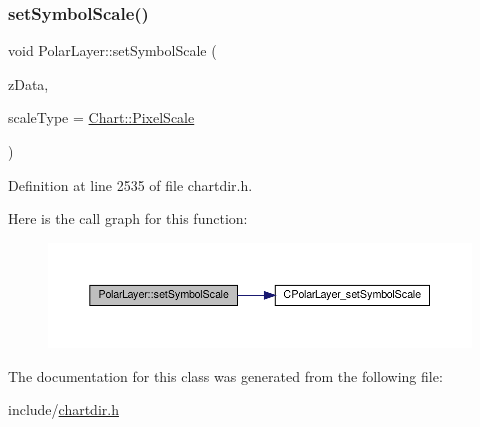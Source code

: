 \subsubsection{\texorpdfstring{set\+Symbol\+Scale()}{setSymbolScale()}}
{\footnotesize\ttfamily void Polar\+Layer\+::set\+Symbol\+Scale (\begin{DoxyParamCaption}\item[{\hyperlink{class_double_array}{Double\+Array}}]{z\+Data,  }\item[{int}]{scale\+Type = {\ttfamily \hyperlink{namespace_chart_af8005281e1fb57d737e9f89b13605808afebebf69a28e58958dc5f9da3ece2147}{Chart\+::\+Pixel\+Scale}} }\end{DoxyParamCaption})\hspace{0.3cm}{\ttfamily [inline]}}



Definition at line 2535 of file chartdir.\+h.

Here is the call graph for this function\+:
\nopagebreak
\begin{figure}[H]
\begin{center}
\leavevmode
\includegraphics[width=350pt]{class_polar_layer_a5c1c2625aa1860690926f32b181fe72d_cgraph}
\end{center}
\end{figure}


The documentation for this class was generated from the following file\+:\begin{DoxyCompactItemize}
\item 
include/\hyperlink{chartdir_8h}{chartdir.\+h}\end{DoxyCompactItemize}
